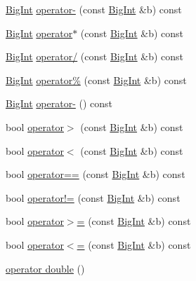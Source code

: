 \begin{DoxyCompactItemize}
\item 
\hyperlink{class_big_int}{Big\+Int} \hyperlink{class_big_int_a64ef59813d4221635ae33f8de10f88cb}{operator-\/} (const \hyperlink{class_big_int}{Big\+Int} \&b) const 
\item 
\hyperlink{class_big_int}{Big\+Int} \hyperlink{class_big_int_aa4e3204ae4a0c81e8e33d0a848078a8d}{operator$\ast$} (const \hyperlink{class_big_int}{Big\+Int} \&b) const 
\item 
\hyperlink{class_big_int}{Big\+Int} \hyperlink{class_big_int_ab5679019b8821c01b161147495e21a4e}{operator/} (const \hyperlink{class_big_int}{Big\+Int} \&b) const 
\item 
\hyperlink{class_big_int}{Big\+Int} \hyperlink{class_big_int_ae9bbf1128217cb469123350f92e4c62f}{operator\%} (const \hyperlink{class_big_int}{Big\+Int} \&b) const 
\item 
\hyperlink{class_big_int}{Big\+Int} \hyperlink{class_big_int_a56350bc8395ed38c2afdbb4554e56b1f}{operator-\/} () const 
\item 
bool \hyperlink{class_big_int_a4631ce319f6617a43a4dc89127953ebb}{operator$>$} (const \hyperlink{class_big_int}{Big\+Int} \&b) const 
\item 
bool \hyperlink{class_big_int_a56b4522f02907f0d719809a0e81c525e}{operator$<$} (const \hyperlink{class_big_int}{Big\+Int} \&b) const 
\item 
bool \hyperlink{class_big_int_a057d936831e7a103a1830366c990602f}{operator==} (const \hyperlink{class_big_int}{Big\+Int} \&b) const 
\item 
bool \hyperlink{class_big_int_ad6a59ed7dedbe35433c1a83ca751fe88}{operator!=} (const \hyperlink{class_big_int}{Big\+Int} \&b) const 
\item 
bool \hyperlink{class_big_int_ae5bdb87103df4be652062b015a1fa653}{operator$>$=} (const \hyperlink{class_big_int}{Big\+Int} \&b) const 
\item 
bool \hyperlink{class_big_int_ada9b7b9e96bb3aad13c48637397b6f31}{operator$<$=} (const \hyperlink{class_big_int}{Big\+Int} \&b) const 
\item 
\hyperlink{class_big_int_a79b9a7b9d93e3c0a932491d613d618e5}{operator double} ()
\end{DoxyCompactItemize}

